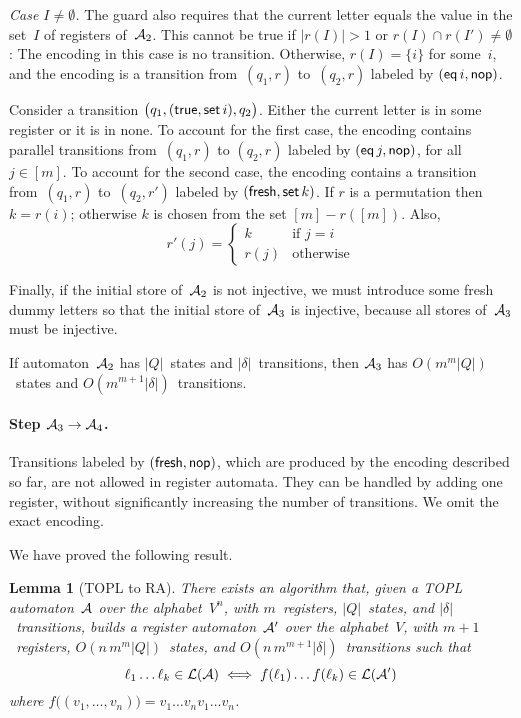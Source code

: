 \documentclass[9pt, preprint]{sigplanconf} %
\newtheorem{lemma}{Lemma}
\theoremstyle{definition}
\theoremstyle{remark}
\begin{document}
\emph{Case $I\ne\emptyset$.}\quad
The guard also requires that the current letter equals the value in the set~$I$ of registers of~${\cal A}_2$.
This cannot be true if $|r(I)|>1$ or $r(I)\cap r(I')\ne\emptyset$: The encoding in this case is no transition.
Otherwise, $r(I)=\{i\}$ for some~$i$, and the encoding is a transition from~$(q_1,r)$ to~$(q_2,r)$ labeled by $({\sf eq}\,i,{\sf nop})$.

\smallskip
Consider a transition $\bigl(q_1,({\sf true},{\sf set}\,i),q_2\bigr)$.
Either the current letter is in some register or it is in none.
To account for the first case, the encoding contains parallel transitions from~$(q_1,r)$ to $(q_2,r)$ labeled by $({\sf eq}\,j,{\sf nop})$, for all $j\in[m]$.
To account for the second case, the encoding contains a transition from~$(q_1,r)$ to~$(q_2,r')$ labeled by $({\sf fresh},{\sf set}\,k)$.
If $r$ is a permutation then $k=r(i)$; otherwise $k$ is chosen from the set $[m]-r([m])$.
Also,
\[r'(j)=
\begin{cases}
k &\text{if $j=i$}\\
r(j) &\text{otherwise}
\end{cases}\]

\smallskip
Finally, if the initial store of~${\cal A}_2$ is not injective, we must introduce some fresh dummy letters so that the initial store of~${\cal A}_3$ is injective, because all stores of~${\cal A}_3$ must be injective.

If automaton~${\cal A}_2$ has $|Q|$~states and $|\delta|$~transitions, then ${\cal A}_3$ has $O(m^m|Q|)$~states and $O(m^{m+1}|\delta|)$~transitions.

\paragraph{Step ${\cal A}_3\to{\cal A}_4$.}
Transitions labeled by $({\sf fresh},{\sf nop})$, which are produced by the encoding described so far, are not allowed in register automata.
They can be handled by adding one register, without significantly increasing the number of transitions.
We omit the exact encoding.

We have proved the following result.

\begin{lemma}[TOPL to RA]\label{lemma:topl-to-ra}
There exists an algorithm that, given a TOPL automaton~${\cal A}$ over the alphabet~$V^n$, with $m$~registers, $|Q|$~states, and $|\delta|$~transitions, builds a register automaton~${\cal A}'$ over the alphabet~$V$, with $m+1$~registers, $O(n\,m^m|Q|)$~states, and $O(n\,m^{m+1}|\delta|)$~transitions such that
\[\ell_1\ldots \ell_k\in{\cal L}({\cal A}) \iff
  f(\ell_1)\ldots f(\ell_k)\in{\cal L}({\cal A}') \]
where $f\bigl((v_1,\ldots,v_n)\bigr)=v_1\ldots v_n v_1\ldots v_n$.
\end{lemma}
\end{document}
